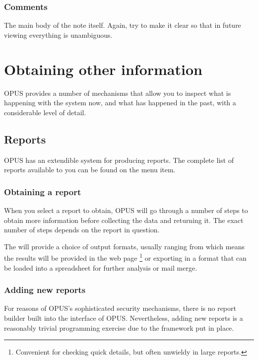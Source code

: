 \documentclass[12 pt]{book}
\begin{document}
\subsection{Comments}

The main body of the note itself. Again, try to make it clear so that in 
future viewing everything is unambiguous.



%
%
%

\chapter{Obtaining other information}

OPUS provides a number of mechanisms that allow you to inspect what is
happening with the system now, and what has happened in the past, with a
considerable level of detail.

\section{Reports}

OPUS has an extendible system for producing reports. The complete list of
reports available to you can be found on the 
 menu item.

\subsection{Obtaining a report}

When you select a report to obtain, OPUS will go through a number of steps to
obtain more information before collecting the data and returning it. The exact
number of steps depends on the report in question.

The  will provide a choice of output formats, usually
ranging from  which means the results will be 
provided in the web page%
\footnote{Convenient for checking quick details, but often unwieldy in large reports.}
or exporting in a format that can be loaded into a spreadsheet for further
analysis or mail merge.


\subsection{Adding new reports}

For reasons of OPUS's sophisticated security mechanisms, there is no report
builder built into the interface of OPUS. Nevertheless, adding new reports
is a reasonably trivial programming exercise due to the framework put in place.
\end{document}
